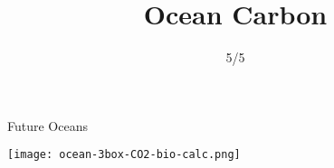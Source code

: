 

\title{Ocean Carbon}
\author{5/5}



\begin{frame}{Future Oceans}
    
    \texttt{[image: ocean-3box-CO2-bio-calc.png]}
        
\end{frame}




